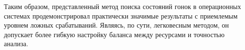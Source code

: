 Таким   образом,   представленный   метод   поиска  состояний  гонок в операционных системах продемонстрировал практически значимые результаты
с приемлемым уровнем ложных срабатываний.
Являясь, по сути, легковесным методом, он допускает более гибкую настройку баланса между ресурсами и точностью анализа.
%
%
%
%
